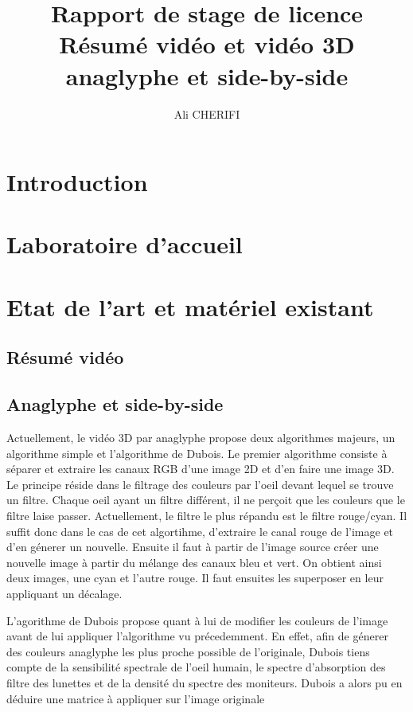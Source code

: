 \documentclass[10pt,a4paper]{article}
\author{Ali CHERIFI}
\title{Rapport de stage de licence\\Résumé vidéo et vidéo 3D anaglyphe et side-by-side}
\begin{document}
\maketitle
\newpage
\tableofcontents
\section{Introduction}

\section{Laboratoire d'accueil}



\section{Etat de l'art et matériel existant}
\subsection{Résumé vidéo}

\subsection{Anaglyphe et side-by-side}
Actuellement, le vidéo 3D par anaglyphe propose deux algorithmes majeurs, un algorithme simple et l'algorithme de Dubois.
Le premier algorithme consiste à séparer et extraire les canaux RGB d'une image 2D et d'en faire une image 3D. Le principe réside dans le filtrage des couleurs par l'oeil devant lequel se trouve un filtre.
Chaque oeil ayant un filtre différent, il ne perçoit que les couleurs que le filtre laise passer. Actuellement, le filtre le plus répandu est le filtre rouge/cyan.
Il suffit donc dans le cas de cet algortihme, d'extraire le canal rouge de l'image et d'en génerer un nouvelle. Ensuite il faut à partir de l'image source créer une nouvelle image à partir du mélange des canaux bleu et vert. On obtient ainsi deux images, une cyan et l'autre rouge. Il faut ensuites les superposer en leur appliquant un décalage.

L'agorithme de Dubois propose quant à lui de modifier les couleurs de l'image avant de lui appliquer l'algorithme vu précedemment. En effet, afin de génerer des couleurs anaglyphe les plus proche possible de l'originale, Dubois tiens compte de la sensibilité spectrale de l'oeil humain, le spectre d'absorption des filtre des lunettes et de la densité du spectre des moniteurs. Dubois a alors pu en déduire une matrice à appliquer sur l'image originale 
\end{document}
